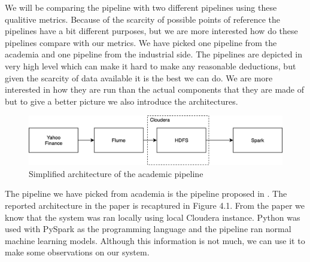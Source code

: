 

We will be comparing the pipeline with two different pipelines using these qualitive metrics.
Because of the scarcity of possible points of reference the pipelines have a bit different purposes, but we are more interested how do these pipelines compare with our metrics.
We have picked one pipeline from the academia and one pipeline from the industrial side.
The pipelines are depicted in very high level which can make it hard to make any reasonable deductions, but given the scarcity of data available it is the best we can do.
We are more interested in how they are run than the actual components that they are made of but to give a better picture we also introduce the architectures.

\begin{figure}[ht!]
    \includegraphics[scale=0.50]{images/example1} 
    \centering
    \caption{Simplified architecture of the academic pipeline}
\end{figure}

The pipeline we have picked from academia is the pipeline proposed in \cite{peng}.
The reported architecture in the paper is recaptured in Figure 4.1.
From the paper we know that the system was ran locally using local Cloudera instance.
Python was used with PySpark as the programming language and the pipeline ran normal machine learning models.
Although this information is not much, we can use it to make some observations on our system.

